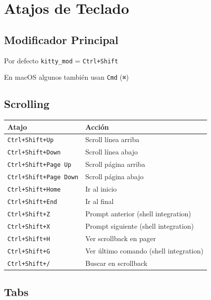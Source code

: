 \documentclass[
  doc,
  floatsintext,
  longtable,
  a4paper,
  nolmodern,
  notxfonts,
  notimes,
  12pt,
  colorlinks=true,linkcolor=blue,citecolor=blue,urlcolor=blue]{apa7}
\newcounter{none} %
\begin{document}
\section{Atajos de Teclado}\label{atajos-de-teclado}

\subsection{Modificador Principal}\label{modificador-principal}

Por defecto \texttt{kitty\_mod} = \texttt{Ctrl+Shift}

En macOS algunos también usan \texttt{Cmd} (\texttt{⌘})

\subsection{Scrolling}\label{scrolling}

{\def\LTcaptype{none} %
\begin{longtable}[]{@{}ll@{}}
\toprule\noalign{}
Atajo & Acción \\
\midrule\noalign{}
\endhead
\bottomrule\noalign{}
\endlastfoot
\texttt{Ctrl+Shift+Up} & Scroll línea arriba \\
\texttt{Ctrl+Shift+Down} & Scroll línea abajo \\
\texttt{Ctrl+Shift+Page\ Up} & Scroll página arriba \\
\texttt{Ctrl+Shift+Page\ Down} & Scroll página abajo \\
\texttt{Ctrl+Shift+Home} & Ir al inicio \\
\texttt{Ctrl+Shift+End} & Ir al final \\
\texttt{Ctrl+Shift+Z} & Prompt anterior (shell integration) \\
\texttt{Ctrl+Shift+X} & Prompt siguiente (shell integration) \\
\texttt{Ctrl+Shift+H} & Ver scrollback en pager \\
\texttt{Ctrl+Shift+G} & Ver último comando (shell integration) \\
\texttt{Ctrl+Shift+/} & Buscar en scrollback \\
\end{longtable}
}

\subsection{Tabs}\label{tabs}
\end{document}
